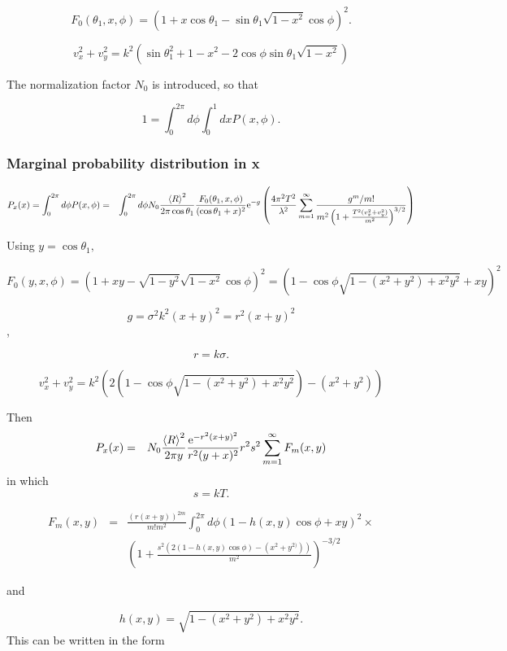 \documentclass[11pt,openany]{report}
\newcommand{\e}{{\rm e}}
\begin{document}
{{$$F_{0}(\theta_{1},x,\phi)=\left(1+x\cos\theta_{1}-\sin\theta_{1}\sqrt{1-x^{2}}\cos\phi\right)^{2}.$$

$$v_{x}^{2}+v_{y}^{2}=k^{2}\left(\sin\theta_{1}^{2}+1-x^{2}-2\cos\phi\sin\theta_{1}\sqrt{1-x^{2}}\right)$$

The normalization factor $N_{0}$ is introduced, so that

$$1=\int_{0}^{2\pi}d\phi\int_{0}^{1}dxP(x,\phi).$$

\subsubsection{Marginal probability distribution in x}
\begin{eqnarray}
P_{x}(x)=\int_{0}^{2\pi}d\phi P(x,\phi)&=&
\int_{0}^{2\pi}d\phi N_{0}\frac{\left<R\right>^{2}}{2\pi\cos\theta_{1}}\frac{F_{0}(\theta_{1},x,\phi)}{(\cos{\theta_{1}}+x)^{2}}
\e^{-g}\left(\frac{4\pi^{2}T^{2}}{\lambda^{2}}\sum_{m=1}^{\infty}\frac{g^{m}/m!}{m^{2}\left(1+\frac{T^{2}(v_{x}^{2}+v_{y}^{2})}{m^{2}}\right)^{3/2}}\right)
\end{eqnarray}

Using $y=\cos\theta_{1},$

$$F_{0}(y,x,\phi)=\left(1+xy-\sqrt{1-y^{2}}\sqrt{1-x^{2}}\cos\phi\right)^{2}=\left(1-\cos\phi\sqrt{1-(x^{2}+y^{2})+x^{2}y^{2}}+xy\right)^{2}$$

$$g=\sigma^{2}k^{2}(x+y)^{2}=r^{2}(x+y)^{2}$$,

$$r=k\sigma.$$

$$v_{x}^{2}+v_{y}^{2}=k^{2}\left(2\left(1-\cos\phi\sqrt{1-(x^{2}+y^{2})+x^{2}y^{2}}\right)-(x^{2}+y^{2})\right)$$

Then
\begin{eqnarray}
P_{x}(x)&=&N_{0}\frac{\left<R\right>^{2}}{2\pi y}\frac{\e^{-r^{2}(x+y)^{2}}}{r^{2}(y+x)^{2}}
r^{2}s^{2}
\sum_{m=1}^{\infty}F_{m}(x,y)
\end{eqnarray}
in which
$$s=kT.$$

\begin{eqnarray} F_{m}(x,y)&=&\frac{(r(x+y))^{2m}}{m!m^{2}}\int_{0}^{2\pi}d\phi\left(1-h(x,y)\cos\phi +xy\right)^{2}\times\\
&&\left(1+\frac{s^{2}\left(2(1-h(x,y)\cos\phi )-(x^{2}+y^{2)})\right)}{m^{2}}\right)^{-3/2}
\end{eqnarray}

and

$$h(x,y)=\sqrt{1-(x^{2}+y^{2})+x^{2}y^{2}}.$$
This can be written in the form

}}
\end{document}
